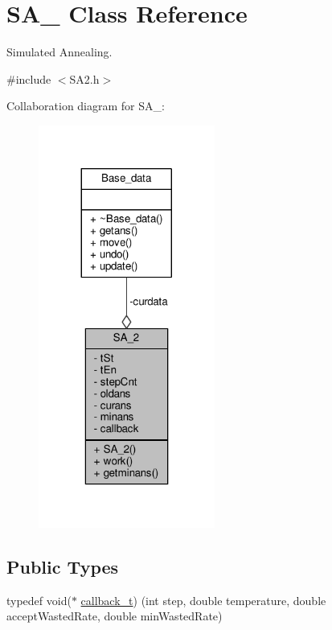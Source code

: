 \hypertarget{classSA__2}{}\section{S\+A\+\_ Class Reference}
\label{classSA__2}


Simulated Annealing.  




{\ttfamily \#include $<$S\+A2.\+h$>$}



Collaboration diagram for S\+A\+\_\+:
\nopagebreak
\begin{figure}[H]
\begin{center}
\leavevmode
\includegraphics[width=164pt]{classSA__2__coll__graph}
\end{center}
\end{figure}
\subsection*{Public Types}
\begin{DoxyCompactItemize}
\item 
typedef void($\ast$ \hyperlink{classSA__2_a1c708dff32ff0526b5b5926e38e77dee}{callback\+\_\+t}) (int step, double temperature, double accept\+Wasted\+Rate, double min\+Wasted\+Rate)
\end{DoxyCompactItemize}
